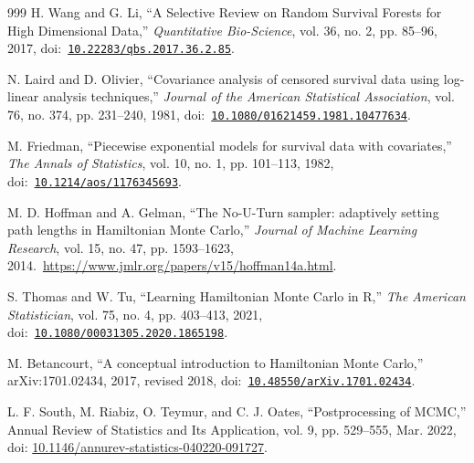 \begin{thebibliography}{999}
\def\currentbiburl{https://doi.org/10.22283/qbs.2017.36.2.85}
 H. Wang and G. Li, ``A Selective Review on Random Survival Forests for High Dimensional Data,'' \emph{Quantitative Bio-Science}, vol. 36, no. 2, pp. 85--96, 2017, doi:~\href{https://doi.org/10.22283/qbs.2017.36.2.85}{\nolinkurl{10.22283/qbs.2017.36.2.85}}.

\def\currentbiburl{https://doi.org/10.1080/01621459.1981.10477634}
N. Laird and D. Olivier, ``Covariance analysis of censored survival data using log-linear analysis techniques,'' \emph{Journal of the American Statistical Association}, vol. 76, no. 374, pp. 231--240, 1981, doi:~\href{https://doi.org/10.1080/01621459.1981.10477634}{\nolinkurl{10.1080/01621459.1981.10477634}}.

\def\currentbiburl{https://doi.org/10.1214/aos/1176345693}
M. Friedman, ``Piecewise exponential models for survival data with covariates,'' \emph{The Annals of Statistics}, vol. 10, no. 1, pp. 101--113, 1982, doi:~\href{https://doi.org/10.1214/aos/1176345693}{\nolinkurl{10.1214/aos/1176345693}}.

\def\currentbiburl{https://www.jmlr.org/papers/v15/hoffman14a.html}
M. D. Hoffman and A. Gelman, ``The No-U-Turn sampler: adaptively setting path lengths in Hamiltonian Monte Carlo,'' \emph{Journal of Machine Learning Research}, vol. 15, no. 47, pp. 1593--1623, 2014.~\url{https://www.jmlr.org/papers/v15/hoffman14a.html}.

\def\currentbiburl{https://doi.org/10.1080/00031305.2020.1865198}
 S. Thomas and W. Tu, ``Learning Hamiltonian Monte Carlo in R,'' \emph{The American Statistician}, vol. 75, no. 4, pp. 403--413, 2021, doi:~\href{https://doi.org/10.1080/00031305.2020.1865198}{\nolinkurl{10.1080/00031305.2020.1865198}}.

\def\currentbiburl{https://doi.org/10.48550/arXiv.1701.02434}
 M. Betancourt, ``A conceptual introduction to Hamiltonian Monte Carlo,'' arXiv:1701.02434, 2017, revised 2018, doi:~\href{https://doi.org/10.48550/arXiv.1701.02434}{\nolinkurl{10.48550/arXiv.1701.02434}}.

\def\currentbiburl{https://doi.org/10.1146/annurev-statistics-040220-091727}
 L. F. South, M. Riabiz, O. Teymur, and C. J. Oates, ``Postprocessing of MCMC,'' Annual Review of Statistics and Its Application, vol. 9, pp. 529--555, Mar. 2022, doi: \href{https://doi.org/10.1146/annurev-statistics-040220-091727}{10.1146/annurev-statistics-040220-091727}.


\end{thebibliography}
